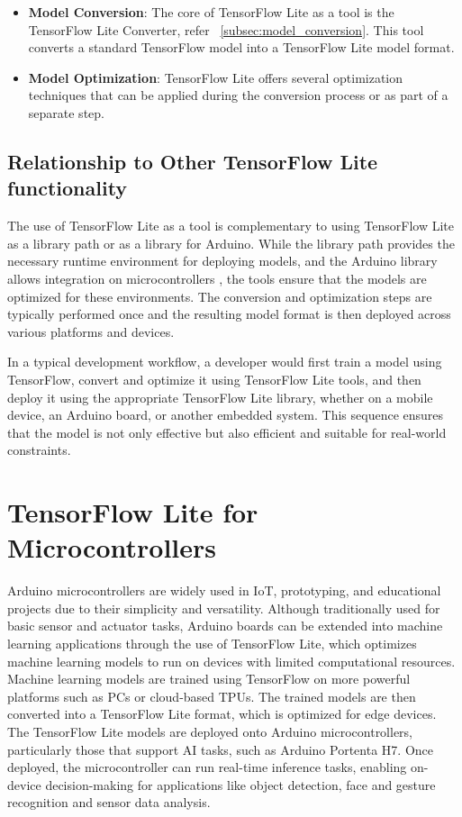\begin{itemize}
	\item \textbf{Model Conversion}: The core of TensorFlow Lite as a tool is the TensorFlow Lite Converter, refer ~\ref{subsec:model_conversion}. This tool converts a standard TensorFlow model into a  TensorFlow Lite model format.
	\item \textbf{Model Optimization}: TensorFlow Lite offers several optimization techniques that can be applied during the conversion process or as part of a separate step.
\end{itemize}


\subsection{Relationship to Other TensorFlow Lite functionality}
The use of TensorFlow Lite as a tool is complementary to using TensorFlow Lite as a library path or as a library for Arduino. While the library path provides the necessary runtime environment for deploying models, and the Arduino library allows integration on microcontrollers \cite{tfl_Microcontrollers:2024}, the tools ensure that the models are optimized for these environments. The conversion and optimization steps are typically performed once and the resulting model format  is then deployed across various platforms and devices. \cite{tensorflowModelConversion:2024}

In a typical development workflow, a developer would first train a model using TensorFlow, convert and optimize it using TensorFlow Lite tools, and then deploy it using the appropriate TensorFlow Lite library, whether on a mobile device, an Arduino board, or another embedded system. This sequence ensures that the model is not only effective but also efficient and suitable for real-world constraints.

\section{TensorFlow Lite for Microcontrollers}
Arduino microcontrollers are widely used in IoT, prototyping, and educational projects due to their simplicity and versatility. Although traditionally used for basic sensor and actuator tasks, Arduino boards can be extended into machine learning applications through the use of TensorFlow Lite, which optimizes machine learning models to run on devices with limited computational resources.
Machine learning models are trained using TensorFlow on more powerful platforms such as PCs or cloud-based TPUs. The trained models are then converted into a TensorFlow Lite format, which is optimized for edge devices. The TensorFlow Lite models are deployed onto Arduino microcontrollers, particularly those that support AI tasks, such as Arduino Portenta H7. Once deployed, the microcontroller can run real-time inference tasks, enabling on-device decision-making for applications like object detection, face and gesture recognition and sensor data analysis. \cite{tfl_Microcontrollers:2024}

